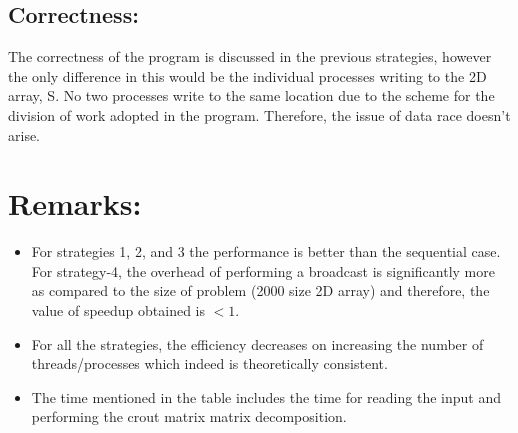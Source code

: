 \documentclass[12pt]{article}
\begin{document}
\subsection*{Correctness:}

The correctness of the program is discussed in the previous 
strategies, however the only difference in this would be the 
individual processes writing to the 2D array, S. No two processes 
write to the same location due to the scheme for the division of 
work adopted in the program. Therefore, the issue of data race 
doesn't arise.

\section*{Remarks:}

\begin{itemize}
  \item For strategies 1, 2, and 3 the performance is better than the sequential case. 
  For strategy-4, the overhead of performing a broadcast is significantly more as compared
  to the size of problem (2000 size 2D array) and therefore, the value of speedup obtained is
  $< 1$.
  \item For all the strategies, the efficiency decreases on increasing the number of threads/processes
  which indeed is theoretically consistent.
  \item The time mentioned in the table includes the time for reading the input and performing the crout matrix
  matrix decomposition.
\end{itemize}
\end{document}
